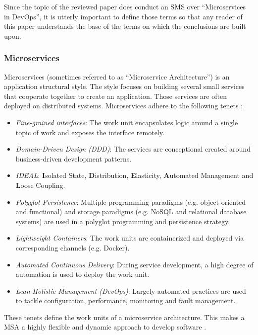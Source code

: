 Since the topic of the reviewed paper does conduct an SMS over ``Microservices in DevOps'',
it is utterly important to define those terms so that any reader of this paper
understands the base of the terms on which the conclusions are built upon.

\subsubsection{Microservices}

Microservices (sometimes referred to as ``Microservice Architecture'') is an application
structural style. The style focuses on building several small services that cooperate
together to create an application. Those services are often deployed on distributed
systems. Microservices adhere to the following tenets \cite{zio:MSATenets}:

\begin{itemize}
    \item \textit{Fine-grained interfaces}: The work unit encapsulates logic
    around a single topic of work and exposes the interface remotely.
    \item \textit{Domain-Driven Design (DDD)}: The services are conceptional
    created around business-driven development patterns.
    \item \textit{IDEAL}: \textbf{I}solated State, \textbf{D}istribution,
    \textbf{E}lasticity, \textbf{A}utomated Management and \textbf{L}oose Coupling.
    \item \textit{Polyglot Persistence}: Multiple programming paradigms (e.g.
    object-oriented and functional) and storage paradigms (e.g. NoSQL and relational
    database systems) are used in a polyglot programming and persistence strategy.
    \item \textit{Lightweight Containers}: The work units are containerized and
    deployed via corresponding channels (e.g. Docker).
    \item \textit{Automated Continuous Delivery}: During service development,
    a high degree of automation is used to deploy the work unit.
    \item \textit{Lean Holistic Management (DevOps)}: Largely automated practices
    are used to tackle configuration, performance, monitoring and fault management.
\end{itemize}

These tenets define the work units of a microservice architecture. This makes
a MSA a highly flexible and dynamic approach to develop software \cite{zio:MSATenets}.

